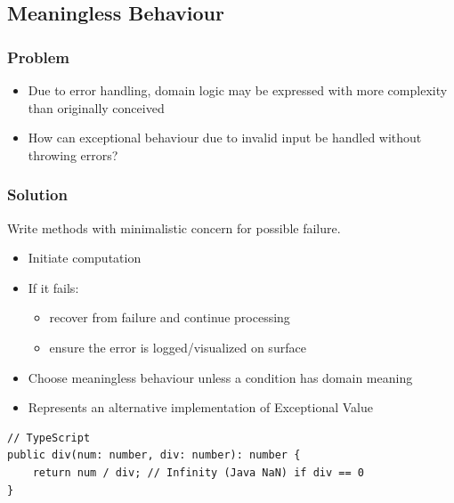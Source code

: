 \subsection{Meaningless Behaviour}
\subsubsection{Problem}
\begin{itemize}
    \item Due to error handling, domain logic may be expressed with more complexity than originally conceived
    \item How can exceptional behaviour due to invalid input be handled without throwing errors?
\end{itemize}
\subsubsection{Solution}
Write methods with minimalistic concern for possible failure.
\begin{itemize}
    \item Initiate computation
    \item If it fails:
    \begin{itemize}
        \item recover from failure and continue processing
        \item ensure the error is logged/visualized on surface
    \end{itemize}
    \item Choose meaningless behaviour unless a condition has domain meaning 
    \item Represents an alternative implementation of Exceptional Value
\end{itemize}
\begin{lstlisting}
// TypeScript
public div(num: number, div: number): number {
    return num / div; // Infinity (Java NaN) if div == 0
}
\end{lstlisting}

